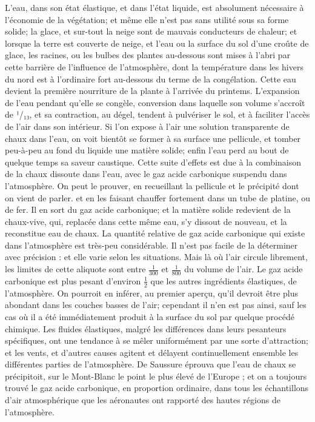 L'eau, dans son état élastique, et dans l'état liquide, est absolument nécessaire à\setcounter{page}{7} l'économie de la végétation; et même elle n'est pas sans utilité sous sa forme solide; la glace, et sur-tout la neige sont de mauvais conducteurs de chaleur; et lorsque la terre est couverte de neige, et l'eau ou la surface du sol d'une croûte de glace, les racines, ou les bulbes des plantes au-dessous sont mises à l'abri par cette barrière de l'influence de l'atmosphère, dont la température dans les hivers du nord est à l'ordinaire fort au-dessous du terme de la congélation. Cette eau devient la première nourriture de la plante à l'arrivée du printems. L'expansion de l'eau pendant qu'elle se congèle, conversion dans laquelle son volume s'accroît de ¹/₁₃, et sa contraction, au dégel, tendent à pulvériser le sol, et à faciliter l'accès de l'air dans son intérieur. Si l'on expose à l'air une solution transparente de chaux dans l'eau, on voit bientôt se former à sa surface une pellicule, et tomber peu-à-peu au fond du liquide une matière solide; enfin l'eau perd au bout de quelque temps sa saveur caustique. Cette suite d'effets est due à la combinaison de la chaux dissoute dans l'eau, avec le gaz acide carbonique suspendu dans l'atmosphère. On peut le prouver, en recueillant la pellicule et le précipité dont on vient de parler.\setcounter{page}{8} et en les faisant chauffer fortement dans un tube de platine, ou de fer. Il en sort du gaz acide carbonique; et la matière solide redevient de la chaux-vive, qui, replacée dans cette même eau, s'y dissout de nouveau, et la reconstitue eau de chaux.
La quantité relative de gaz acide carbonique qui existe dans l'atmosphère est très-peu considérable. Il n'est pas facile de la déterminer avec précision : et elle varie selon les situations. Mais là où l'air circule librement, les limites de cette aliquote sont entre $\frac{1}{300}$ et $\frac{1}{800}$ du volume de l'air. Le gaz acide carbonique est plus pesant d'environ $\frac{1}{2}$ que les autres ingrédients élastiques, de l'atmosphère. On pourroit en inférer, au premier aperçu, qu'il devroit être plus abondant dans les couches basses de l'air; cependant il n'en est pas ainsi, sauf les cas où il a été immédiatement produit à la surface du sol par quelque procédé chimique. Les fluides élastiques, malgré les différences dans leurs pesanteurs spécifiques, ont une tendance à se mêler uniformément par une sorte d'attraction; et les vents, et d'autres causes agitent et délayent continuellement ensemble les différentes parties de l'atmosphère. De Saussure éprouva que l'eau de chaux se précipitoit, sur le Mont-Blanc le\setcounter{page}{9} point le plus élevé de l'Europe ; et on a toujours trouvé le gaz acide carbonique, en proportion ordinaire, dans tous les échantillons d'air atmosphérique que les aéronautes ont rapporté des hautes régions de l'atmosphère.
